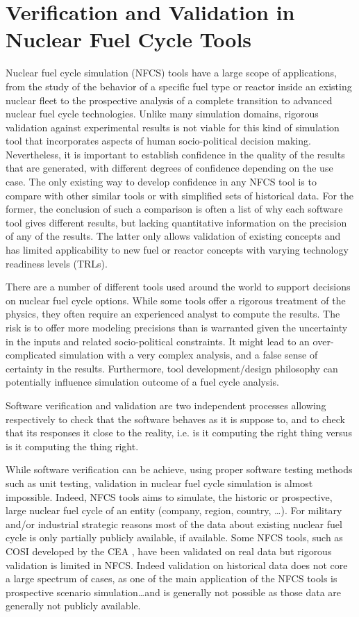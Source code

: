 \section{Verification and Validation in Nuclear Fuel Cycle Tools}

Nuclear fuel cycle simulation (NFCS) tools have a large scope of applications,
from the study of the behavior of a specific fuel type or reactor inside an
existing nuclear fleet to the prospective analysis of a complete transition to
advanced nuclear fuel cycle technologies. Unlike many simulation domains,
rigorous validation against experimental results is not viable for this kind of
simulation tool that incorporates aspects of human socio-political decision
making. Nevertheless, it is important to establish confidence in the quality of
the results that are generated, with different degrees of confidence depending
on the use case. The only existing way to develop confidence in any NFCS tool
is to compare with other similar tools or with simplified sets of historical
data. For the former, the conclusion of such a comparison is often a list of why
each software tool gives different results, but lacking quantitative information
on the precision of any of the results. The latter only allows validation of
existing concepts and has limited applicability to new fuel or reactor concepts
with varying technology readiness levels (TRLs).

There are a number of different tools used around the world to support decisions
on nuclear fuel cycle options. While some tools offer a rigorous treatment of
the physics, they often require an experienced analyst to compute the results.
The risk is to offer more modeling precisions than is warranted given the
uncertainty in the inputs and related socio-political constraints. It might lead
to an over-complicated simulation with a very complex analysis, and a false
sense of certainty in the results. Furthermore, tool development/design
philosophy can potentially influence simulation outcome of a fuel cycle
analysis.

Software verification and validation are two independent processes allowing
respectively to check that the software behaves as it is suppose to, and to
check that its responses it close to the reality, i.e. is it computing the right
thing versus is it computing the thing right.

While software verification can be achieve, using proper software testing
methods such as unit testing, validation in nuclear fuel cycle
simulation is almost impossible. Indeed, NFCS tools aims to simulate, the
historic or prospective, large nuclear fuel cycle of an entity (company, region,
country, \ldots). For military and/or industrial strategic reasons most
of the data about existing nuclear fuel cycle is only partially publicly
available, if available.
Some NFCS tools, such as COSI developed by the CEA \cite{COSI6 - Coquelet}, have
been validated on real data but rigorous validation is limited in NFCS. Indeed
validation on historical data does not core a large spectrum of cases, as one of the main
application of the NFCS tools is prospective scenario simulation\ldots and is
generally not possible as those data are generally not publicly available.

